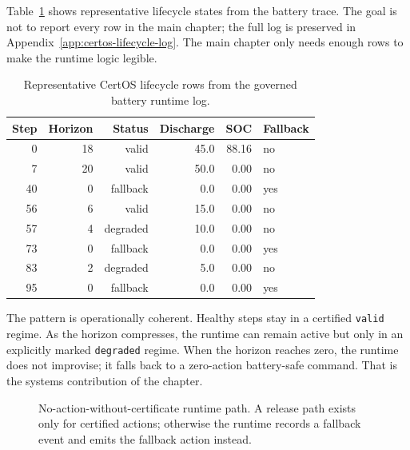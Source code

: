 Table~\ref{tab:certos-representative-rows} shows representative lifecycle
states from the battery trace.  The goal is not to report every row in the
main chapter; the full log is preserved in Appendix~\ref{app:certos-lifecycle-log}.
The main chapter only needs enough rows to make the runtime logic legible.

\begin{table}[ht]
\centering
\caption{Representative CertOS lifecycle rows from the governed battery
runtime log.}
\label{tab:certos-representative-rows}
\begin{tabular}{rrrrrl}
\toprule
\textbf{Step} & \textbf{Horizon} & \textbf{Status} & \textbf{Discharge} &
\textbf{SOC} & \textbf{Fallback} \\
\midrule
0  & 18 & valid    & 45.0 & 88.16 & no \\
7  & 20 & valid    & 50.0 & 0.00  & no \\
40 & 0  & fallback & 0.0  & 0.00  & yes \\
56 & 6  & valid    & 15.0 & 0.00  & no \\
57 & 4  & degraded & 10.0 & 0.00  & no \\
73 & 0  & fallback & 0.0  & 0.00  & yes \\
83 & 2  & degraded & 5.0  & 0.00  & no \\
95 & 0  & fallback & 0.0  & 0.00  & yes \\
\bottomrule
\end{tabular}
\end{table}

The pattern is operationally coherent.  Healthy steps stay in a certified
\texttt{valid} regime.  As the horizon compresses, the runtime can remain
active but only in an explicitly marked \texttt{degraded} regime.  When the
horizon reaches zero, the runtime does not improvise; it falls back to a
zero-action battery-safe command.  That is the systems contribution of the
chapter.

\begin{figure}[ht]
\centering
{}
\caption{No-action-without-certificate runtime path.  A release path exists
only for certified actions; otherwise the runtime records a fallback event
and emits the fallback action instead.}
\label{fig:certos-runtime-path}
\end{figure}

